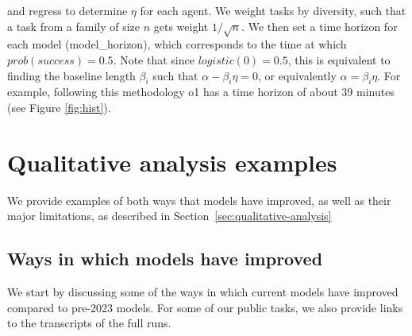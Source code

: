 \documentclass{article}
\begin{document}
and regress to determine $\eta$ for each agent.
We weight tasks by diversity, such that a task from a family of size $n$ gets weight $1/\sqrt n$.
We then set a time horizon for each model (model\_horizon), which corresponds to the time at which $prob(success) = 0.5$. Note that since $logistic(0) = 0.5$, this is equivalent to finding the baseline length $\beta_i$ such that $\alpha - \beta_i \eta = 0$, or equivalently $\alpha = \beta_i \eta$. For example, following this methodology o1 has a time horizon of about 39 minutes (see Figure \ref{fig:hist}).



\section{Qualitative analysis examples} \label{sec:more-qualitative-analysis}
We provide examples of both ways that models have improved, as well as their major limitations, as described in Section~\ref{sec:qualitative-analysis}

\subsection{Ways in which models have improved}\label{sec:model-improvements}


We start by discussing some of the ways in which current models have improved compared to pre-2023 models. For some of our public tasks, we also provide links to the transcripts of the full runs.
\end{document}
